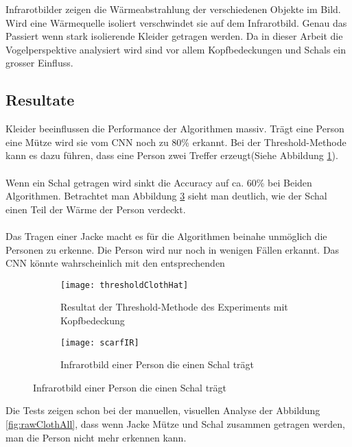 Infrarotbilder zeigen die Wärmeabstrahlung der verschiedenen Objekte im Bild. Wird eine Wärmequelle isoliert verschwindet sie auf dem Infrarotbild. Genau das Passiert wenn stark isolierende Kleider getragen werden. Da in dieser Arbeit die Vogelperspektive analysiert wird sind vor allem Kopfbedeckungen und Schals ein grosser Einfluss.

\subsection{Resultate}
Kleider beeinflussen die Performance der Algorithmen massiv. Trägt eine Person eine Mütze wird sie vom \gls{CNN} noch zu 80\% erkannt. Bei der Threshold-Methode kann es dazu führen, dass eine Person zwei Treffer erzeugt(Siehe Abbildung \ref{fig:thresholdClothHat}).\\
\\
Wenn ein Schal getragen wird sinkt die Accuracy auf ca. 60\% bei Beiden Algorithmen. Betrachtet man Abbildung \ref{fig:scarfIR} sieht man deutlich, wie der Schal einen Teil der Wärme der Person verdeckt.\\
\\
Das Tragen einer Jacke macht es für die Algorithmen beinahe unmöglich die Personen zu erkenne. Die Person wird nur noch in wenigen Fällen erkannt. Das \gls{CNN} könnte wahrscheinlich mit den entsprechenden

\begin{figure}[H]
	\begin{subfigure}{.45\linewidth}
		\centering
		\texttt{[image: thresholdClothHat]}
		\caption{Resultat der Threshold-Methode des Experiments mit Kopfbedeckung}
		\label{fig:thresholdClothHat}
	\end{subfigure}
	\begin{subfigure}{.45\linewidth}
		\centering
		\texttt{[image: scarfIR]}
		\caption{Infrarotbild einer Person die einen Schal trägt}
		\label{fig:scarfIR}
	\end{subfigure}
	
\end{figure}


Die Tests zeigen schon bei der manuellen, visuellen Analyse der Abbildung \ref{fig:rawClothAll}, dass wenn Jacke Mütze und Schal zusammen getragen werden, man die Person nicht mehr erkennen kann.


